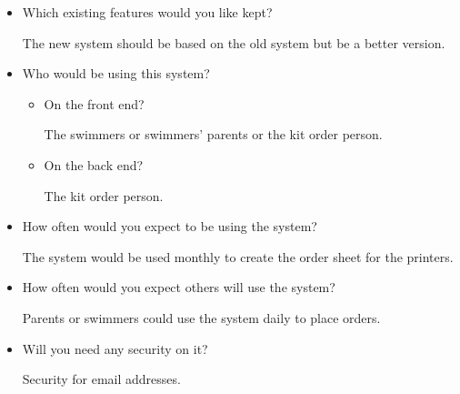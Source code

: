 \documentclass[
11pt, %
a4paper, %
oneside, %
headinclude,footinclude, %
BCOR5mm, %
]{scrartcl}
\begin{document}
\begin{itemize}
\item Which existing features would you like kept?\par

The new system should be based on the old system but be a better version.

\item Who would be using this system?\par
\begin{itemize}
	\item On the front end?\par
	The swimmers or swimmers’ parents or the kit order person.
	\item On the back end?\par
	The kit order person.
\end{itemize}

\item How often would you expect to be using the system?\par

The system would be used monthly to create the order sheet for the printers.

\item How often would you expect others will use the system?\par

Parents or swimmers could use the system daily to place orders.

\item Will you need any security on it?\par

Security for email addresses.
\end{itemize}
\end{document}
